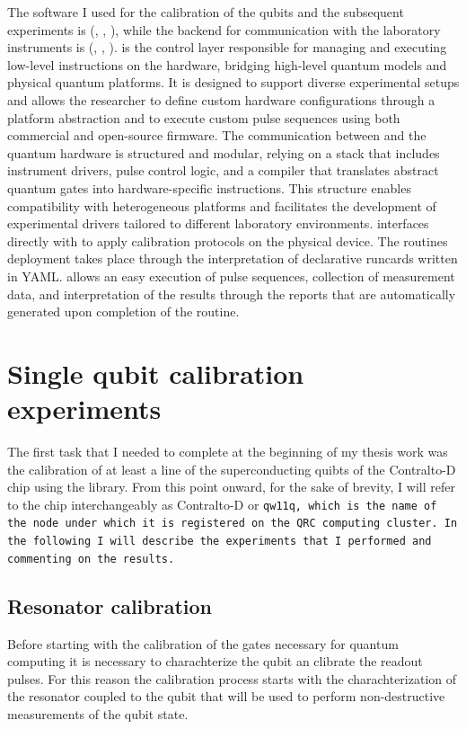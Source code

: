 The software I used for the calibration of the qubits and the subsequent experiments is \Qibocal (\cite{pasquale_qibocal_2024}, \cite{qibocalscience}, \cite{qibocalgit}), while the backend for communication with the laboratory instruments is \Qibolab (\cite{efthymiou_qibolab_2024}, \cite{qibolabscience}, \cite{qibolabgit}).
\Qibolab is the control layer responsible for managing and executing low-level instructions on the hardware, bridging high-level quantum models and physical quantum platforms.
It is designed to support diverse experimental setups and allows the researcher to define custom hardware configurations through a platform abstraction and to execute custom pulse sequences using both commercial and open-source firmware.
The communication between \Qibolab and the quantum hardware is structured and modular, relying on a stack that includes instrument drivers, pulse control logic, and a compiler that translates abstract quantum gates into hardware-specific instructions.
This structure enables compatibility with heterogeneous platforms and facilitates the development of experimental drivers tailored to different laboratory environments.
\Qibocal interfaces directly with \Qibolab to apply calibration protocols on the physical device. The routines deployment takes place through the interpretation of declarative runcards written in YAML.
\Qibocal allows an easy execution of pulse sequences, collection of measurement data, and interpretation of the results through the reports that are automatically generated upon completion of the routine.

\section{Single qubit calibration experiments}\label{sec:calibration}

The first task that I needed to complete at the beginning of my thesis work was the calibration of at least a line of the superconducting quibts of the Contralto-D chip using the \Qibocal library.
From this point onward, for the sake of brevity, I will refer to the chip interchangeably as Contralto-D or \tt{qw11q}, which is the name of the node under which it is registered on the QRC computing cluster.
In the following I will describe the experiments that I performed and commenting on the results.

\subsection{Resonator calibration}
Before starting with the calibration of the gates necessary for quantum computing it is necessary to charachterize the qubit an clibrate the readout pulses. 
For this reason the calibration process starts with the charachterization of the resonator coupled to the qubit that will be used to perform non-destructive measurements of the qubit state.

